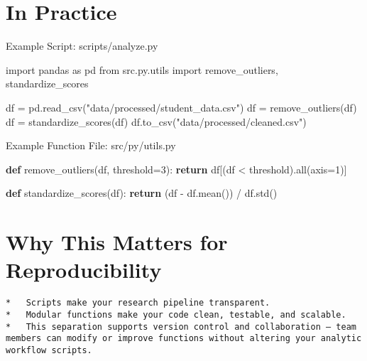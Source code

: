 \documentclass[
  letterpaper,
  DIV=11,
  numbers=noendperiod]{scrreprt}
\newenvironment{Shaded}{\begin{snugshade}}{\end{snugshade}}
\newcommand{\BuiltInTok}[1]{\textcolor[rgb]{0.00,0.23,0.31}{#1}}
\newcommand{\ControlFlowTok}[1]{\textcolor[rgb]{0.00,0.23,0.31}{\textbf{#1}}}
\newcommand{\DecValTok}[1]{\textcolor[rgb]{0.68,0.00,0.00}{#1}}
\newcommand{\ImportTok}[1]{\textcolor[rgb]{0.00,0.46,0.62}{#1}}
\newcommand{\KeywordTok}[1]{\textcolor[rgb]{0.00,0.23,0.31}{\textbf{#1}}}
\newcommand{\NormalTok}[1]{\textcolor[rgb]{0.00,0.23,0.31}{#1}}
\newcommand{\OperatorTok}[1]{\textcolor[rgb]{0.37,0.37,0.37}{#1}}
\newcommand{\StringTok}[1]{\textcolor[rgb]{0.13,0.47,0.30}{#1}}
\begin{document}
\section{In Practice}\label{in-practice}

Example Script: scripts/analyze.py

\begin{Shaded}
\begin{Highlighting}[]
\ImportTok{import}\NormalTok{ pandas }\ImportTok{as}\NormalTok{ pd}
\ImportTok{from}\NormalTok{ src.py.utils }\ImportTok{import}\NormalTok{ remove\_outliers, standardize\_scores}

\NormalTok{df }\OperatorTok{=}\NormalTok{ pd.read\_csv(}\StringTok{"data/processed/student\_data.csv"}\NormalTok{)}
\NormalTok{df }\OperatorTok{=}\NormalTok{ remove\_outliers(df)}
\NormalTok{df }\OperatorTok{=}\NormalTok{ standardize\_scores(df)}
\NormalTok{df.to\_csv(}\StringTok{"data/processed/cleaned.csv"}\NormalTok{)}
\end{Highlighting}
\end{Shaded}

Example Function File: src/py/utils.py

\begin{Shaded}
\begin{Highlighting}[]
\KeywordTok{def}\NormalTok{ remove\_outliers(df, threshold}\OperatorTok{=}\DecValTok{3}\NormalTok{):}
    \ControlFlowTok{return}\NormalTok{ df[(df }\OperatorTok{\textless{}}\NormalTok{ threshold).}\BuiltInTok{all}\NormalTok{(axis}\OperatorTok{=}\DecValTok{1}\NormalTok{)]}

\KeywordTok{def}\NormalTok{ standardize\_scores(df):}
    \ControlFlowTok{return}\NormalTok{ (df }\OperatorTok{{-}}\NormalTok{ df.mean()) }\OperatorTok{/}\NormalTok{ df.std()}
\end{Highlighting}
\end{Shaded}

\section{Why This Matters for
Reproducibility}\label{why-this-matters-for-reproducibility}

\begin{verbatim}
*   Scripts make your research pipeline transparent.
*   Modular functions make your code clean, testable, and scalable.
*   This separation supports version control and collaboration — team members can modify or improve functions without altering your analytic workflow scripts.
\end{verbatim}
\end{document}

